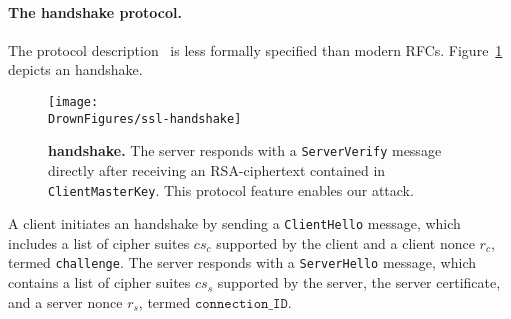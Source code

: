 



\paragraph{The \ssltwo handshake protocol.}
\label{sec:ssl2}
The \ssltwo protocol description~\cite{SSLv2}  is less formally specified than modern RFCs. Figure~\ref{fig:ssl-handshake} depicts an \ssltwo handshake.
%
\begin{figure}
	\texttt{[image: \\DrownFigures/ssl-handshake]} 
	\caption{\textbf{\ssltwo handshake.} The server responds with a \texttt{ServerVerify} message directly after receiving an RSA-\PKCS ciphertext contained in \texttt{ClientMasterKey}. This protocol feature enables our attack.}
	\label{fig:ssl-handshake}
\end{figure}
%
A client initiates an \ssltwo handshake by sending a
\texttt{ClientHello} message, which includes a list of cipher
suites $cs_c$ supported by the client and a client nonce $r_c$,
termed \texttt{challenge}.
The server responds with a \texttt{ServerHello} message, which
contains a list of cipher suites $cs_s$ supported by the server,
the server certificate, and a server nonce $r_s$, termed
$\texttt{connection\_ID}$.

